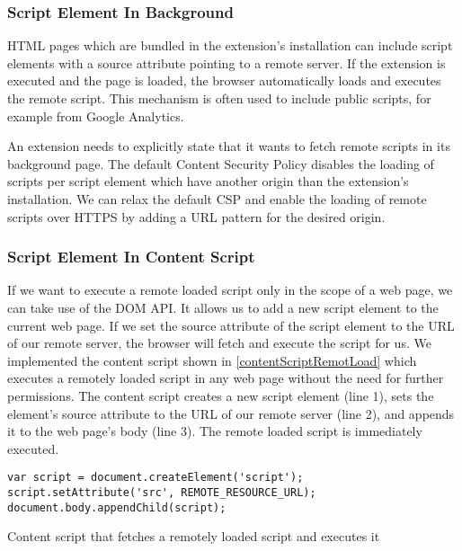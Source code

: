 \subsubsection{Script Element In Background}
	
	HTML pages which are bundled in the extension's installation can include script elements with a source attribute pointing to a remote server. If the extension is executed and the page is loaded, the browser automatically loads and executes the remote script. This mechanism is often used to include public scripts, for example from Google Analytics. 
	
	An extension needs to explicitly state that it wants to fetch remote scripts in its background page. The default Content Security Policy disables the loading of scripts per script element which have another origin than the extension's installation. We can relax the default CSP and enable the loading of remote scripts over HTTPS by adding a URL pattern for the desired origin. 
	
\subsubsection{Script Element In Content Script}

	If we want to execute a remote loaded script only in the scope of a web page, we can take use of the DOM API. It allows us to add a new script element to the current web page. If we set the source attribute of the script element to the URL of our remote server, the browser will fetch and execute the script for us. We implemented the content script shown in \autoref{contentScriptRemotLoad} which executes a remotely loaded script in any web page without the need for further permissions. The content script creates a new script element (line 1), sets the element's source attribute to the URL of our remote server (line 2), and appends it to the web page's body (line 3). The remote loaded script is immediately executed.
	
	\begin{code}
		\begin{lstlisting}
var script = document.createElement('script');
script.setAttribute('src', REMOTE_RESOURCE_URL);
document.body.appendChild(script);
\end{lstlisting}
		\caption{Content script that fetches a remotely loaded script and executes it}
		\label{code:loadScriptWithScriptElement}
	\end{code}
	
